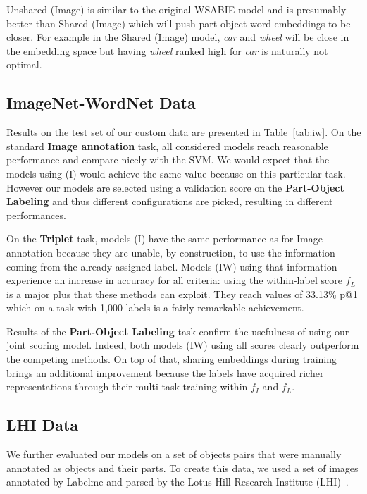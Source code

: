 Unshared (Image) is similar to the original WSABIE model
and is presumably better than Shared (Image) which will push part-object word
embeddings to be closer. For example in the Shared (Image) model, {\it car} and
{\it wheel} will be close in the embedding space but having {\it wheel} ranked high
for {\it car} is naturally not optimal.






\subsection{ImageNet-WordNet Data}

Results on the test set of our custom data are presented in Table~\ref{tab:iw}.
%
On the standard {\bf Image annotation} task, all considered models reach
reasonable performance and compare nicely with the SVM.  We would expect that
the models using (I)
would achieve the same value because on this particular task.
However our models are selected using a validation score on the {\bf
Part-Object Labeling} and thus different configurations are picked, resulting
in different performances.




On the {\bf Triplet} task, models (I) have the same performance as for 
{Image annotation} because they are unable, by construction, to use the information
coming from the already assigned label. Models (IW) using that
information experience an increase in accuracy for all criteria: using
the within-label score $f_L$ is a major plus that these methods can
exploit. They reach values of  33.13\% p@1 which on a
task with 1,000 labels is a fairly remarkable achievement.

Results of the {\bf Part-Object Labeling} task
confirm the usefulness of using our joint scoring model. Indeed, both
models (IW) using all scores clearly outperform the competing methods. 
On top of that, sharing embeddings during training brings an additional
improvement because the labels have acquired richer representations
through their multi-task training within $f_I$ and $f_L$.


\subsection{LHI Data}
We further evaluated our models on a set of objects pairs that were
manually annotated as objects and their parts. To create this data, we
used a set of images annotated by Labelme \cite{labelme} and parsed
by the Lotus Hill Research Institute (LHI)~\cite{yao2009image}. 

